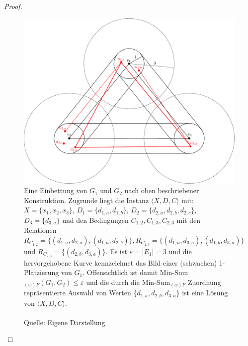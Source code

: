 \documentclass[a4paper, 12pt, twoside]{article}
\theoremstyle{Format1} %
\begin{document}
\begin{proof}
\begin{figure}[H]
	\centering
	\includegraphics[width=\linewidth]{chapter_4_construction.pdf}
	\caption{
		Eine Einbettung von $G_1$ und $G_2$ nach oben beschriebener Konstruktion. Zugrunde liegt die Instanz $\langle X,D,C \rangle$ mit: $X=\{x_1,x_2,x_3\}$,
		$D_1=\{d_{1,a},d_{1,b}\}$, $D_2=\{d_{2,a},d_{2,b},d_{2,c}\}$, $D_3=\{d_{3,a}\}$ und den Bedingungen $C_{1,2},C_{1,3},C_{2,3}$ mit den Relationen
		$R_{C_{1,2}} = \{(d_{1,a},d_{2,a}),(d_{1,a},d_{2,b})\}, R_{C_{1,3}} = \{(d_{1,a},d_{3,a}),(d_{1,b},d_{3,a})\}$ und $R_{C_{2,3}} = \{(d_{2,b},d_{3,a})\}$.
		Es ist $\varepsilon = |E_1| = 3$ und die hervorgehobene Kurve kennzeichnet das Bild einer (schwachen) 1-Platzierung von $G_1$. Offensichtlich ist
		damit Min-Sum$_{(w)F}(G_1,G_2) \leq \varepsilon$ und die durch die Min-Sum$_{(w)F}$ Zuordnung repräsentierte Auswahl von Werten
		$\{d_{1,a}, d_{2,b}, d_{3,a}\}$ ist eine Lösung von $\langle X,D,C \rangle$.
		\\
		\\
		Quelle: Eigene Darstellung
	}
	\label{chapter_4_construction}
\end{figure}


\end{proof}
\end{document}

